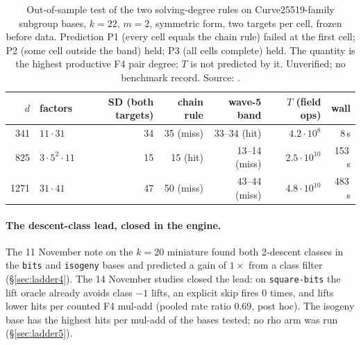 \begin{table}[tbp]
\centering\small
\begin{tabular}{@{}rlrrrrr@{}}
\toprule
$d$ & factors & SD (both targets) & chain rule & wave-5 band & $T$ (field ops) & wall \\
\midrule
341 & $11\cdot31$ & 34 & 35 (miss) & 33--34 (hit) & $4.2\cdot10^8$ & 8\,s \\
825 & $3\cdot5^2\cdot11$ & 15 & 15 (hit) & 13--14 (miss) & $2.5\cdot10^{10}$ & 153\,s \\
1271 & $31\cdot41$ & 47 & 50 (miss) & 43--44 (miss) & $4.8\cdot10^{10}$ & 483\,s \\
\bottomrule
\end{tabular}
\caption[]{Out-of-sample test of the two solving-degree rules on
Curve25519-family subgroup bases, $k=22$, $m=2$, symmetric form, two
targets per cell, frozen before data. Prediction P1 (every cell equals the
chain rule) failed at the first cell; P2 (some cell outside the band) held;
P3 (all cells complete) held. The quantity is the highest productive F4
pair degree; $T$ is not predicted by it. Unverified; no benchmark record.
Source: .}
\label{tab:open-leads-w6}
\end{table}

\paragraph{The descent-class lead, closed in the engine.} The 11 November
note on the $k=20$ miniature found both 2-descent classes in the
\texttt{bits} and \texttt{isogeny} bases and predicted a gain of $1\times$
from a class filter (\S\ref{sec:ladder4}). The 14 November studies closed
the lead: on \texttt{square-bits} the lift oracle already avoids class
$-1$ lifts, an explicit skip fires 0 times, and lifts lower hits per
counted F4 mul-add (pooled rate ratio $0.69$, post hoc). The isogeny base
has the highest hits per mul-add of the bases tested; no rho arm was run
(\S\ref{sec:ladder5}).

